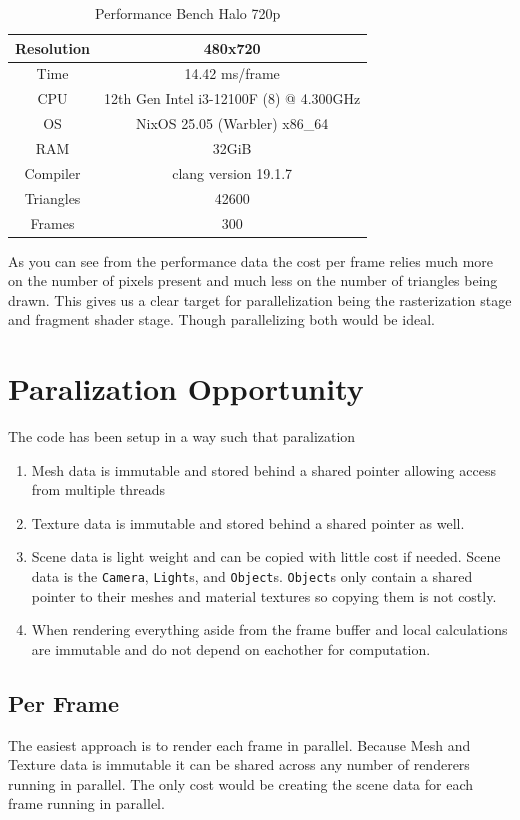 \documentclass[12pt]{article}
\begin{document}
\begin{table}[H]
	\caption{Performance Bench Halo 720p}
	\centering
	\begin{tabular}{|c|c|}
		\hline
		Resolution& 480x720\\\hline
		Time& 14.42 ms/frame\\\hline
		CPU&12th Gen Intel i3-12100F (8) @ 4.300GHz\\\hline
		OS&NixOS 25.05 (Warbler) x86\_64\\\hline
		RAM&32GiB\\\hline
		Compiler&clang version 19.1.7\\\hline
		Triangles&42600\\\hline
		Frames&300\\\hline
	\end{tabular}
	\label{table:performance-720-halo}
\end{table}

As you can see from the performance data the cost per frame relies much more on the number of pixels present and much less on the number of triangles being drawn. This gives us a clear target for parallelization being the rasterization stage and fragment shader stage. Though parallelizing both would be ideal.


\section{Paralization Opportunity}
The code has been setup in a way such that paralization 

\begin{enumerate}
	\item Mesh data is immutable and stored behind a shared pointer allowing access from multiple threads
	\item Texture data is immutable and stored behind a shared pointer as well.
	\item Scene data is light weight and can be copied with little cost if needed.
	\subitem Scene data is the \texttt{Camera}, \texttt{Light}s, and \texttt{Object}s.
	\subitem \texttt{Object}s only contain a shared pointer to their meshes and material textures so copying them is not costly.
	\item When rendering everything aside from the frame buffer and local calculations are immutable and do not depend on eachother for computation.
\end{enumerate}

\subsection{Per Frame}
The easiest approach is to render each frame in parallel. Because Mesh and Texture data is immutable it can be shared across any number of renderers running in parallel. The only cost would be creating the scene data for each frame running in parallel.
\end{document}

